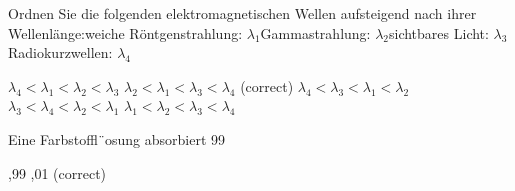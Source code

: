 \documentclass[11pt]{exam}
\begin{document}
\begin{questions}
\vspace{3mm}\question Ordnen Sie die folgenden elektromagnetischen Wellen aufsteigend nach ihrer Wellenlänge:weiche Röntgenstrahlung: \( \lambda_1 \)Gammastrahlung: \( \lambda_2 \)sichtbares Licht: \( \lambda_3 \)Radiokurzwellen: \( \lambda_4 \)

\begin{choices}
	\choice \( \lambda_4 < \lambda_1 < \lambda_2 < \lambda_3 \)
	\choice \( \lambda_2 < \lambda_1 < \lambda_3 < \lambda_4 \) (correct)
	\choice \( \lambda_4 < \lambda_3 < \lambda_1 < \lambda_2 \)
	\choice \( \lambda_3 < \lambda_4 < \lambda_2 < \lambda_1 \)
	\choice \( \lambda_1 < \lambda_2 < \lambda_3 < \lambda_4 \)
\end{choices}

\vspace{3mm}\question Eine Farbstoffl¨osung absorbiert 99 %

\begin{choices}
	,99
	,01
	 (correct)
\end{choices}

\vspace{3mm}\end{questions}
\end{document}
